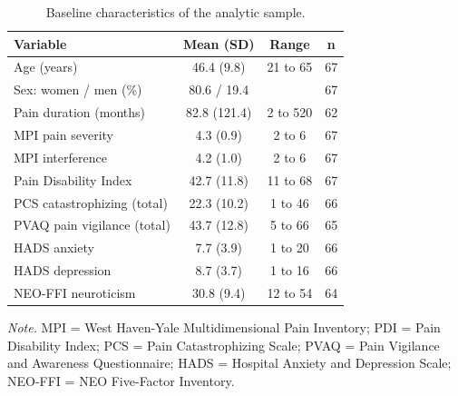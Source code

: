 \begin{table}[!htbp]
\raggedright
\caption{Baseline characteristics of the analytic sample.}
\label{tab:sample}
\footnotesize
\begingroup
\setlength{\tabcolsep}{4pt}
\renewcommand{\arraystretch}{1.08}
\noindent
\begin{tabular*}{\textwidth}{@{\extracolsep{\fill}}lccc@{}}
\toprule
Variable & Mean (SD) & Range & n \\
\midrule
Age (years) & 46.4 (9.8) & 21 to 65 & 67 \\
Sex: women / men (\%) & 80.6 / 19.4 &  & 67 \\
Pain duration (months) & 82.8 (121.4) & 2 to 520 & 62 \\
MPI pain severity & 4.3 (0.9) & 2 to 6 & 67 \\
MPI interference & 4.2 (1.0) & 2 to 6 & 67 \\
Pain Disability Index & 42.7 (11.8) & 11 to 68 & 67 \\
PCS catastrophizing (total) & 22.3 (10.2) & 1 to 46 & 66 \\
PVAQ pain vigilance (total) & 43.7 (12.8) & 5 to 66 & 65 \\
HADS anxiety & 7.7 (3.9) & 1 to 20 & 66 \\
HADS depression & 8.7 (3.7) & 1 to 16 & 66 \\
NEO-FFI neuroticism & 30.8 (9.4) & 12 to 54 & 64 \\
\bottomrule
\end{tabular*}
\par\vspace{3pt}\noindent\parbox{\textwidth}{\footnotesize\textit{Note.} MPI = West Haven-Yale Multidimensional Pain Inventory; PDI = Pain Disability Index; PCS = Pain Catastrophizing Scale; PVAQ = Pain Vigilance and Awareness Questionnaire; HADS = Hospital Anxiety and Depression Scale; NEO-FFI = NEO Five-Factor Inventory.}
\endgroup
\end{table}

